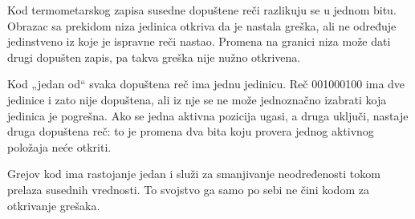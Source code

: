 Kod termometarskog zapisa susedne dopuštene reči razlikuju se u jednom bitu. Obrazac sa prekidom niza jedinica otkriva da je nastala greška, ali ne određuje jedinstveno iz koje je ispravne reči nastao. Promena na granici niza može dati drugi dopušten zapis, pa takva greška nije nužno otkrivena.

Kod „jedan od“ svaka dopuštena reč ima jednu jedinicu. Reč 001000100 ima dve jedinice i zato nije dopuštena, ali iz nje se ne može jednoznačno izabrati koja jedinica je pogrešna. Ako se jedna aktivna pozicija ugasi, a druga uključi, nastaje druga dopuštena reč: to je promena dva bita koju provera jednog aktivnog položaja neće otkriti.

Grejov kod ima rastojanje jedan i služi za smanjivanje neodređenosti tokom prelaza susednih vrednosti. To svojstvo ga samo po sebi ne čini kodom za otkrivanje grešaka.
